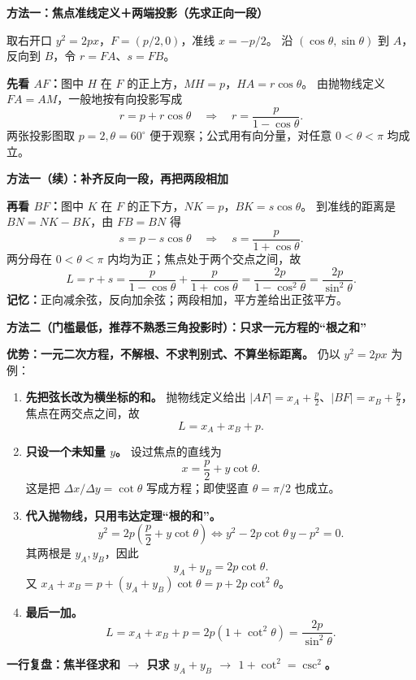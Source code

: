 \clearpage

\clearpage
\begin{proofbox}
\textbf{\textcolor{CProof}{方法一：焦点准线定义＋两端投影（先求正向一段）}}

取右开口 $y^2=2px$，$F=(p/2,0)$，准线 $x=-p/2$。
沿 $(\cos\theta,\sin\theta)$ 到 $A$，反向到 $B$，令 $r=FA$、$s=FB$。
\begin{center}\end{center}
\textbf{先看 $AF$：}图中 $H$ 在 $F$ 的正上方，$MH=p$，$HA=r\cos\theta$。
由抛物线定义 $FA=AM$，一般地按有向投影写成
\[
 r=p+r\cos\theta\quad\Longrightarrow\quad
 \boxed{r=\frac{p}{1-\cos\theta}}.
\]
两张投影图取 $p=2,\theta=60^\circ$ 便于观察；公式用有向分量，对任意 $0<\theta<\pi$ 均成立。
\end{proofbox}
\clearpage
\begin{proofbox}
\textbf{\textcolor{CProof}{方法一（续）：补齐反向一段，再把两段相加}}
\begin{center}\end{center}
\textbf{再看 $BF$：}图中 $K$ 在 $F$ 的正下方，$NK=p$，$BK=s\cos\theta$。
到准线的距离是 $BN=NK-BK$，由 $FB=BN$ 得
\[
 s=p-s\cos\theta\quad\Longrightarrow\quad
 \boxed{s=\frac{p}{1+\cos\theta}}.
\]
两分母在 $0<\theta<\pi$ 内均为正；焦点处于两个交点之间，故
\[
 L=r+s=\frac p{1-\cos\theta}+\frac p{1+\cos\theta}
 =\frac{2p}{1-\cos^2\theta}=\boxed{\frac{2p}{\sin^2\theta}}.
\]
\textbf{记忆：}正向减余弦，反向加余弦；两段相加，平方差给出正弦平方。
\end{proofbox}
\clearpage
\begin{proofbox}
\textbf{\textcolor{CProof}{方法二（门槛最低，推荐不熟悉三角投影时）：只求一元方程的“根之和”}}\par
\textbf{优势：一元二次方程，不解根、不求判别式、不算坐标距离。}
仍以 $y^2=2px$ 为例：
\begin{enumerate}[leftmargin=*,itemsep=.35em]
\item \textbf{先把弦长改为横坐标的和。} 抛物线定义给出
$|AF|=x_A+\frac p2$、$|BF|=x_B+\frac p2$，焦点在两交点之间，故
\[\boxed{L=x_A+x_B+p}.\]
\item \textbf{只设一个未知量 $y$。} 设过焦点的直线为
\[x=\frac p2+y\cot\theta.\]
这是把 $\Delta x/\Delta y=\cot\theta$ 写成方程；即使竖直 $\theta=\pi/2$ 也成立。
\item \textbf{代入抛物线，只用韦达定理“根的和”。}
\[
y^2=2p\left(\frac p2+y\cot\theta\right)
\iff y^2-2p\cot\theta\,y-p^2=0.
\]
其两根是 $y_A,y_B$，因此
\[y_A+y_B=2p\cot\theta.\]
又 $x_A+x_B=p+(y_A+y_B)\cot\theta=p+2p\cot^2\theta$。
\item \textbf{最后一加。}
\[
L=x_A+x_B+p=2p(1+\cot^2\theta)
=\boxed{\frac{2p}{\sin^2\theta}}.
\]
\end{enumerate}
\textbf{一行复盘：焦半径求和 $\to$ 只求 $y_A+y_B$ $\to$ $1+\cot^2=\csc^2$。}
\end{proofbox}
